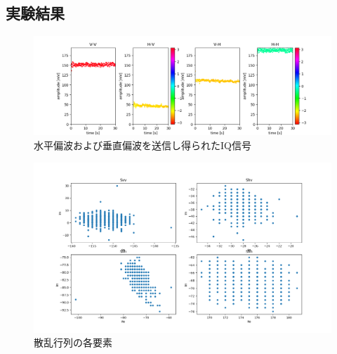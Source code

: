 \documentclass[uplatex,a4paper]{jsarticle}
\begin{document}
\subsection{実験結果}


\begin{figure}[hbtp]
	\centering
	\includegraphics[scale=0.5]{../img/20220707_test_1_AmPh4_2Tx2Rx.png}
    \caption{水平偏波および垂直偏波を送信し得られたIQ信号}
	\label{fig:iq}
\end{figure}
\begin{figure}[hbtp]
	\centering
	\includegraphics[scale=0.4]{../img/20220707_test_1_IQ4_2Tx2Rx.png}
    \caption{散乱行列の各要素}
	\label{fig:scatter}
\end{figure}
\end{document}
